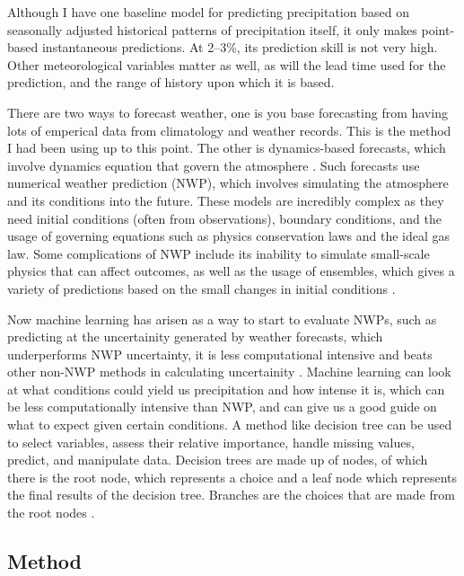 \documentclass[11pt]{report}
\begin{document}
Although I have one baseline model for predicting precipitation based on
seasonally adjusted historical patterns of precipitation itself, it only
makes point-based instantaneous predictions.  At 2--3\%, its prediction
skill is not very high. Other meteorological variables matter as well, as
will the lead time used for the prediction, and the range of history upon
which it is based.

There are two ways to forecast weather, one is you base forecasting from having lots of emperical data from climatology and weather records. This is the method I had been using up to this point. The other is  dynamics-based forecasts, which involve dynamics equation that govern the atmosphere \cite[]{WF}. Such forecasts use numerical weather prediction (NWP), which involves simulating the atmosphere and its conditions into the future. These models are incredibly complex as they need initial conditions
(often from observations), boundary conditions, and the usage of governing
equations such as physics conservation laws and the ideal gas law. Some
complications of NWP include its inability to simulate small-scale physics
that can affect outcomes, as well as the usage of ensembles, which gives a
variety of predictions based on the small changes in initial conditions
\cite[]{NWP}. 

Now machine learning has arisen as a way to start to evaluate NWPs, such as
predicting at the uncertainity generated by weather forecasts, which 
underperforms NWP uncertainty, it is less computational intensive and beats
other non-NWP methods in calculating uncertainity \cite[]{Scher}.
Machine learning can look at what conditions could yield us precipitation
and how intense it is, which can be less computationally intensive than NWP,
and can give us a good guide on what to expect given certain
conditions.  A method like decision tree can be used to select variables,
assess their relative importance, handle missing values, predict, and
manipulate data. Decision trees are made up of nodes, of which there is the
root node, which represents a choice and a leaf node which represents the
final results of the decision tree. Branches are the choices that are made
from the root nodes \cite[]{DT}.


\subsection{Method}
\end{document}
